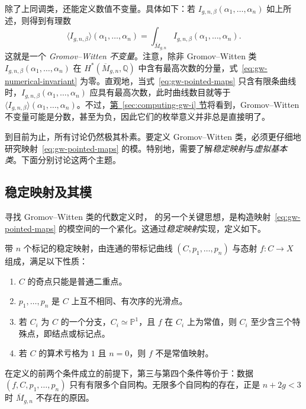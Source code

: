 除了上同调类，还能定义数值不变量。具体如下：若 $I_{g,n,\beta}(\alpha_1,\ldots,\alpha_n)$ 如上所述，则得到有理数
\begin{equation}\label{eq:gw-numerical-invariant}
\langle I_{g,n,\beta}\rangle(\alpha_1,\ldots,\alpha_n)
=\int_{\overline M_{g,n}}I_{g,n,\beta}(\alpha_1,\ldots,\alpha_n).
\end{equation}
这就是一个 \emph{Gromov--Witten 不变量}。注意，除非 Gromov--Witten 类
$I_{g,n,\beta}(\alpha_1,\ldots,\alpha_n)$ 在 $H^*(\overline M_{g,n},\mathbb Q)$ 中含有最高次数的分量，式~\eqref{eq:gw-numerical-invariant} 为零。直观地，当式~\eqref{eq:gw-pointed-maps} 只含有限条曲线时，$I_{g,n,\beta}(\alpha_1,\ldots,\alpha_n)$ 应具有最高次数，此时曲线数目就等于
$\langle I_{g,n,\beta}\rangle(\alpha_1,\ldots,\alpha_n)$。不过，\hyperref[sec:computing-gw-i]{第~\ref*{sec:computing-gw-i} 节}将看到，Gromov--Witten 不变量可能是分数，甚至为负，因此它们的枚举意义并非总是直接明了。

到目前为止，所有讨论仍然极其朴素。要定义 Gromov--Witten 类，必须更仔细地研究映射~\eqref{eq:gw-pointed-maps} 的模。特别地，需要了解\emph{稳定映射}与\emph{虚拟基本类}。下面分别讨论这两个主题。

\subsection{稳定映射及其模}\label{subsec:stable-maps}
寻找 Gromov--Witten 类的代数定义时， 的另一个关键思想，是构造映射~\eqref{eq:gw-pointed-maps} 的模空间的一个紧化。这通过\emph{稳定映射}实现，定义如下。

\begin{definition}\label{def:stable-map}
带 $n$ 个标记的稳定映射，由连通的带标记曲线 $(C,p_1,\ldots,p_n)$ 与态射 $f:C\to X$ 组成，满足以下性质：
\begin{enumerate}[label=(\roman*)]
\item $C$ 的奇点只能是普通二重点。
\item $p_1,\ldots,p_n$ 是 $C$ 上互不相同、有次序的光滑点。
\item 若 $C_i$ 为 $C$ 的一个分支，$C_i\simeq\mathbb P^1$，且 $f$ 在 $C_i$ 上为常值，则 $C_i$ 至少含三个特殊点，即结点或标记点。
\item 若 $C$ 的算术亏格为 $1$ 且 $n=0$，则 $f$ 不是常值映射。
\end{enumerate}
\end{definition}
在定义的前两个条件成立的前提下，第三与第四个条件等价于：数据
$(f,C,p_1,\ldots,p_n)$ 只有有限多个自同构。无限多个自同构的存在，正是 $n+2g<3$ 时 $\overline M_{g,n}$ 不存在的原因。

